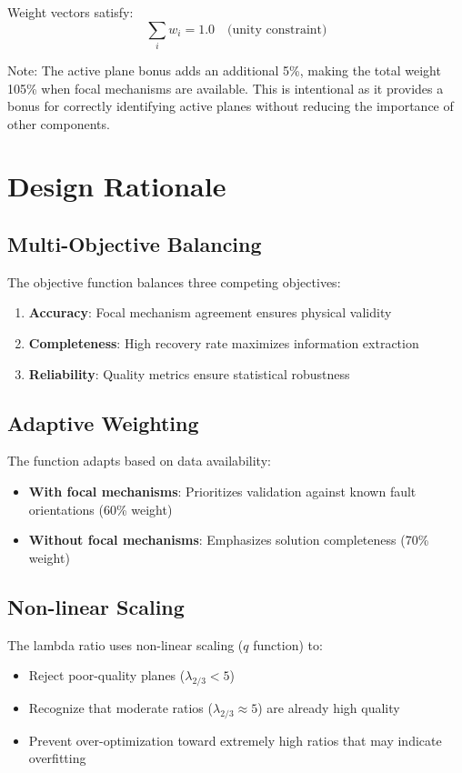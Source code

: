 \documentclass[11pt,a4paper]{article}
\begin{document}
Weight vectors satisfy:
\begin{equation}
\sum_{i} w_i = 1.0 \quad \text{(unity constraint)}
\end{equation}

Note: The active plane bonus adds an additional 5\%, making the total weight 105\% when focal mechanisms are available. This is intentional as it provides a bonus for correctly identifying active planes without reducing the importance of other components.

\section{Design Rationale}

\subsection{Multi-Objective Balancing}

The objective function balances three competing objectives:

\begin{enumerate}
    \item \textbf{Accuracy}: Focal mechanism agreement ensures physical validity
    \item \textbf{Completeness}: High recovery rate maximizes information extraction
    \item \textbf{Reliability}: Quality metrics ensure statistical robustness
\end{enumerate}

\subsection{Adaptive Weighting}

The function adapts based on data availability:
\begin{itemize}
    \item \textbf{With focal mechanisms}: Prioritizes validation against known fault orientations (60\% weight)
    \item \textbf{Without focal mechanisms}: Emphasizes solution completeness (70\% weight)
\end{itemize}

\subsection{Non-linear Scaling}

The lambda ratio uses non-linear scaling ($q$ function) to:
\begin{itemize}
    \item Reject poor-quality planes ($\lambda_{2/3} < 5$)
    \item Recognize that moderate ratios ($\lambda_{2/3} \approx 5$) are already high quality
    \item Prevent over-optimization toward extremely high ratios that may indicate overfitting
\end{itemize}
\end{document}
